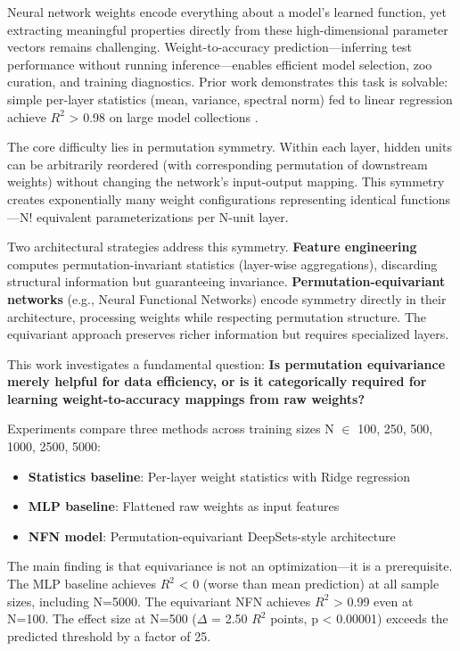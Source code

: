 
Neural network weights encode everything about a model's learned function, yet extracting meaningful properties directly from these high-dimensional parameter vectors remains challenging. Weight-to-accuracy prediction---inferring test performance without running inference---enables efficient model selection, zoo curation, and training diagnostics. Prior work demonstrates this task is solvable: simple per-layer statistics (mean, variance, spectral norm) fed to linear regression achieve $R^2$ > 0.98 on large model collections \citep{unterthiner2020predicting}.

The core difficulty lies in permutation symmetry. Within each layer, hidden units can be arbitrarily reordered (with corresponding permutation of downstream weights) without changing the network's input-output mapping. This symmetry creates exponentially many weight configurations representing identical functions---N! equivalent parameterizations per N-unit layer.

Two architectural strategies address this symmetry. \textbf{Feature engineering} computes permutation-invariant statistics (layer-wise aggregations), discarding structural information but guaranteeing invariance. \textbf{Permutation-equivariant networks} (e.g., Neural Functional Networks) encode symmetry directly in their architecture, processing weights while respecting permutation structure. The equivariant approach preserves richer information but requires specialized layers.

This work investigates a fundamental question: \textbf{Is permutation equivariance merely helpful for data efficiency, or is it categorically required for learning weight-to-accuracy mappings from raw weights?}

Experiments compare three methods across training sizes N $\in$ {100, 250, 500, 1000, 2500, 5000}:
\begin{itemize}
\item \textbf{Statistics baseline}: Per-layer weight statistics with Ridge regression
\item \textbf{MLP baseline}: Flattened raw weights as input features
\item \textbf{NFN model}: Permutation-equivariant DeepSets-style architecture
\end{itemize}

The main finding is that equivariance is not an optimization---it is a prerequisite. The MLP baseline achieves $R^2$ < 0 (worse than mean prediction) at all sample sizes, including N=5000. The equivariant NFN achieves $R^2$ > 0.99 even at N=100. The effect size at N=500 ($\Delta$ = 2.50 $R^2$ points, p < 0.00001) exceeds the predicted threshold by a factor of 25.
